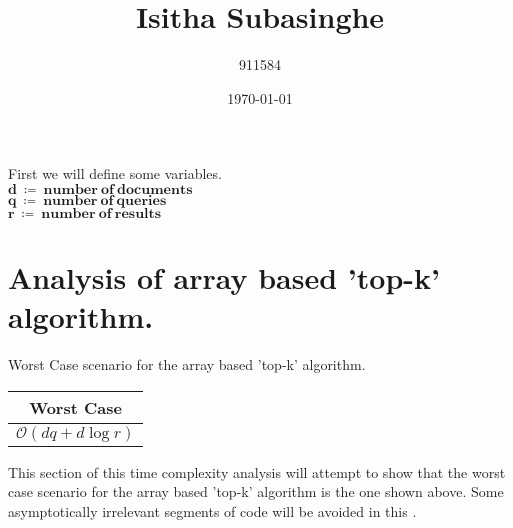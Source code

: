 \documentclass[%
 aip,
 jmp,%
 amsmath,amssymb,
 reprint,%
]{revtex4-1}
\begin{document}

\title[COMP20007 Assignment 1]{Isitha Subasinghe}%

\author{911584}

\date{\today}%

\maketitle

\begin{center}
    \vspace{2.5mm}
    First we will define some variables. \\
    \vspace{1.25mm}
    $\boldsymbol{d \ \coloneqq \ number \ of \ documents} $ \\
    $\boldsymbol{q \ \coloneqq \ number \ of \ queries} $ \\
    $\boldsymbol{r \ \coloneqq \ number \ of \ results} $ \\
    \vspace{2.5mm}
\end{center}

\section{\label{sec:level1}Analysis of array based 
    'top-k' algorithm.}

\begin{center}
    Worst Case scenario for the array based 'top-k' algorithm. \\
    
    \begin{tabular}{|c|} 
        \hline
            Worst Case \\ [0.5ex] 
            \hline
            $\mathcal{O}(dq + d\log{}r)$ \\ 
            \hline
    \end{tabular}
    
    \vspace{2.5mm}
    This section of this time complexity analysis will attempt to show that the
    worst case scenario for the array based 'top-k' algorithm is the one shown above.
    Some asymptotically irrelevant segments of code will be avoided in this .
\end{center}
\end{document}

